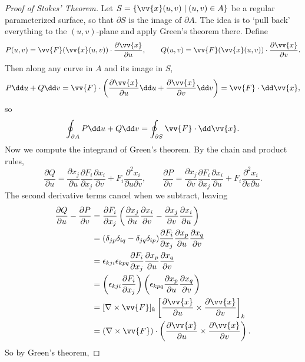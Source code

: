 \begin{proof}[Proof of Stokes' Theorem]
	Let $S = \{\vv{x}(u, v) \mid (u, v) \in A\}$ be a regular parameterized surface, so that $\partial S$ is the image of $\partial A$. The idea is to `pull back' everything to the $(u, v)$-plane and apply Green's theorem there. Define
	$$
	P(u, v) = \vv{F}(\vv{x}(u, v)) \cdot \frac{\partial \vv{x}}{\partial u}, \quad \quad Q(u, v) = \vv{F}(\vv{x}(u, v)) \cdot \frac{\partial \vv{x}}{\partial v}.
	$$
	Then along any curve in $A$ and its image in $S$,
	$$
	P \dd u + Q \dd v = \vv{F} \cdot \left(\frac{\partial \vv{x}}{\partial u} \dd u + \frac{\partial \vv{x}}{\partial v} \dd v\right) = \vv{F} \cdot \dd \vv{x},
	$$
	so
	$$
	\oint_{\partial A} P \dd u + Q \dd v = \oint_{\partial S} \vv{F} \cdot \dd \vv{x}.
	$$
	Now we compute the integrand of Green's theorem. By the chain and product rules,
	$$
	\frac{\partial Q}{\partial u} = \frac{\partial x_j}{\partial u} \frac{\partial F_i}{\partial x_j} \frac{\partial x_i}{\partial v} + F_i \frac{\partial^2 x_i}{\partial u \partial v}, \quad \quad
	\frac{\partial P}{\partial v} = \frac{\partial x_j}{\partial v} \frac{\partial F_i}{\partial x_j} \frac{\partial x_i}{\partial u} + F_i \frac{\partial^2 x_i}{\partial v \partial u}.
	$$
	The second derivative terms cancel when we subtract, leaving
	\begin{align*}
		\frac{\partial Q}{\partial u} - \frac{\partial P}{\partial v} &= \frac{\partial F_i}{\partial x_j}\left(\frac{\partial x_j}{\partial u}\frac{\partial x_i}{\partial v} - \frac{\partial x_j}{\partial v} \frac{\partial x_i}{\partial u}\right) \\
		&= (\delta_{jp}\delta_{iq} - \delta_{jq}\delta_{ip}) \frac{\partial F_i}{\partial x_j} \frac{\partial x_p}{\partial u} \frac{\partial x_q}{\partial v} \\
		&= \epsilon_{kji}\epsilon_{kpq} \frac{\partial F_i}{\partial x_j} \frac{\partial x_p}{\partial u} \frac{\partial x_q}{\partial v} \\
		&= \left(\epsilon_{kji}\frac{\partial F_i}{\partial x_j}\right) \left(\epsilon_{kpq}\frac{\partial x_p}{\partial u} \frac{\partial x_q}{\partial v}\right) \\
		&= [\nabla \times \vv{F}]_k \left[\frac{\partial \vv{x}}{\partial u} \times \frac{\partial \vv{x}}{\partial v}\right]_k \\
		&= (\nabla \times \vv{F}) \cdot \left(\frac{\partial \vv{x}}{\partial u} \times \frac{\partial \vv{x}}{\partial v}\right).
	\end{align*}
	So by Green's theorem,

\end{proof}
